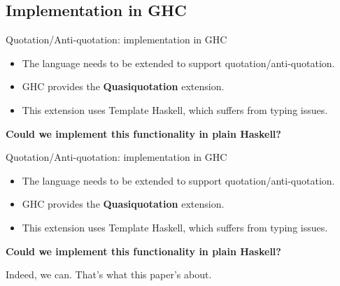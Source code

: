 \documentclass[10pt]{beamer}
\begin{document}
\subsection{Implementation in GHC}
\begin{frame}[fragile]{Quotation/Anti-quotation: implementation in GHC}

\begin{itemize}
\item The language needs to be extended to support quotation/anti-quotation.
\item GHC provides the \textbf{Quasiquotation} extension.
\item This extension uses Template Haskell, which suffers from typing issues.
\end{itemize}

\begin{center}
\textbf{Could we implement this functionality in plain Haskell?}
\end{center}

\end{frame}

\begin{frame}[fragile]{Quotation/Anti-quotation: implementation in GHC}

\begin{itemize}
\item The language needs to be extended to support quotation/anti-quotation.
\item GHC provides the \textbf{Quasiquotation} extension.
\item This extension uses Template Haskell, which suffers from typing issues.
\end{itemize}

\begin{center}
\textbf{Could we implement this functionality in plain Haskell?}

Indeed, we can. That's what this paper's about.
\end{center}

\end{frame}
\end{document}
